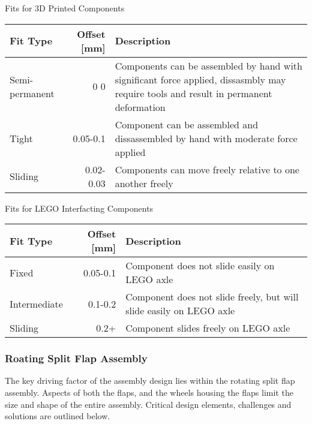 \documentclass[11pt]{article}
\begin{document}
Fits for 3D Printed Components
\begin{center}
\begin{tabular}{lrl}
Fit Type & Offset [mm] & Description\\
\hline
Semi-permanent & 0 0 & Components can be assembled by hand with significant force applied, dissasmbly may require tools and result in permanent deformation\\
Tight & 0.05-0.1 & Component can be assembled and dissassembled by hand with moderate force applied\\
Sliding & 0.02-0.03 & Components can move freely relative to one another  freely\\
\end{tabular}
\end{center}

Fits for LEGO Interfacting Components
\begin{center}
\begin{tabular}{lrl}
Fit Type & Offset [mm] & Description\\
\hline
Fixed & 0.05-0.1 & Component does not slide easily on LEGO axle\\
Intermediate & 0.1-0.2 & Component does not slide freely, but will slide easily on LEGO axle\\
Sliding & 0.2+ & Component slides freely on LEGO axle\\
\end{tabular}
\end{center}


\subsubsection{Roating Split Flap Assembly}
\label{sec:org4877cca}
The key driving factor of the assembly design lies within the rotating split flap assembly. Aspects of both the flaps, and the wheels housing the flaps limit the size and shape of the entire assembly. Critical design elements, challenges and solutions are outlined below.
\end{document}
